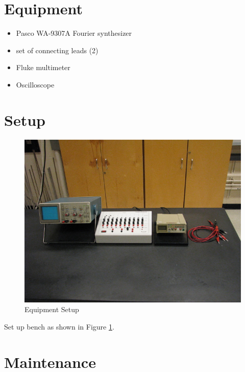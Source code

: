 \section{Equipment}

\begin{minipage}[t]{0.7\textwidth}
\begin{itemize}[noitemsep]
\item Pasco WA-9307A Fourier synthesizer
\item set of connecting leads (2)
\end{itemize}
\end{minipage}
\begin{minipage}[t]{0.3\textwidth}
\begin{itemize}[noitemsep]
\item Fluke multimeter
\item Oscilloscope
\end{itemize}
\end{minipage}

\section{Setup}
\begin{figure}
\includegraphics{Fourier-Series-Setup.jpg}
\caption{Equipment Setup}
\label{pic:FSsetup}
\end{figure}

Set up bench as shown in Figure \ref{pic:FSsetup}.

\section{Maintenance}

